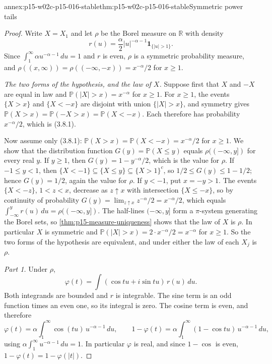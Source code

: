 \begin{annexitem}{annex:p15-w02c-p15-016-stable}{thm:p15-w02c-p15-016-stable}{Symmetric power tails}
\begin{proof}
Write \(X=X_1\) and let \(\rho\) be the Borel measure on
\(\mathbb R\) with density
\[
 r(u)=\frac\alpha2|u|^{-\alpha-1}\mathbf1_{\{|u|>1\}} .
\]
Since \(\int_1^\infty\alpha u^{-\alpha-1}\,du=1\) and \(r\) is even,
\(\rho\) is a symmetric probability measure, and
\(\rho((x,\infty))=\rho((-\infty,-x))=x^{-\alpha}/2\) for
\(x\geq1\).

\emph{The two forms of the hypothesis, and the law of \(X\).}
Suppose first that \(X\) and \(-X\) are equal in law and
\(\mathbb P(|X|>x)=x^{-\alpha}\) for \(x\geq1\). For \(x\geq1\), the
events \(\{X>x\}\) and \(\{X<-x\}\) are disjoint with union
\(\{|X|>x\}\), and symmetry gives
\(\mathbb P(X>x)=\mathbb P(-X>x)=\mathbb P(X<-x)\). Each therefore has
probability \(x^{-\alpha}/2\), which is (3.8.1).

Now assume only (3.8.1):
\(\mathbb P(X>x)=\mathbb P(X<-x)=x^{-\alpha}/2\) for \(x\geq1\).
We show that the distribution function \(G(y)=\mathbb P(X\leq y)\)
equals \(\rho((-\infty,y])\) for every real \(y\).
If \(y\geq1\), then \(G(y)=1-y^{-\alpha}/2\), which is the value for
\(\rho\). If \(-1\leq y<1\), then
\(\{X<-1\}\subseteq\{X\leq y\}\subseteq\{X>1\}^c\), so
\(1/2\leq G(y)\leq1-1/2\); hence \(G(y)=1/2\), again the value for
\(\rho\). If \(y<-1\), put \(x=-y>1\). The events \(\{X<-z\}\),
\(1<z<x\), decrease as \(z\uparrow x\) with intersection
\(\{X\leq-x\}\), so by continuity of probability
\(G(y)=\lim_{z\uparrow x}z^{-\alpha}/2=x^{-\alpha}/2\), which equals
\(\int_{-\infty}^y r(u)\,du=\rho((-\infty,y])\). The half-lines
\((-\infty,y]\) form a \(\pi\)-system generating the Borel sets, so
\cref{thm:p15-measure-uniqueness} shows that the law of \(X\) is
\(\rho\). In particular \(X\) is symmetric and
\(\mathbb P(|X|>x)=2\cdot x^{-\alpha}/2=x^{-\alpha}\) for \(x\geq1\).
So the two forms of the hypothesis are equivalent, and under either
the law of each \(X_j\) is \(\rho\).

\emph{Part 1.} Under \(\rho\),
\[
 \varphi(t)=\int(\cos tu+i\sin tu)\,r(u)\,du .
\]
Both integrands are bounded and \(r\) is integrable. The sine term is
an odd function times an even one, so its integral is zero. The
cosine term is even, and therefore
\[
 \varphi(t)=\alpha\int_1^\infty\cos(tu)\,u^{-\alpha-1}\,du,\qquad
 1-\varphi(t)=\alpha\int_1^\infty(1-\cos tu)\,u^{-\alpha-1}\,du,
\]
using \(\alpha\int_1^\infty u^{-\alpha-1}\,du=1\). In particular
\(\varphi\) is real, and since \(1-\cos\) is even,
\(1-\varphi(t)=1-\varphi(|t|)\).


\end{proof}
\end{annexitem}
